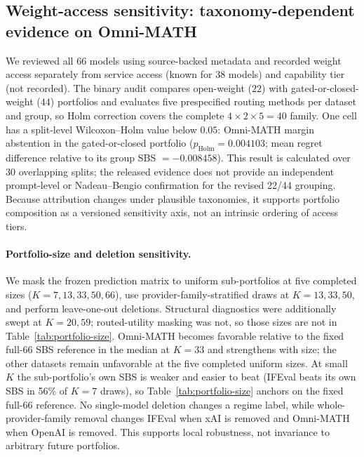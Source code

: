 \documentclass{article}
\begin{document}
\subsection{Weight-access sensitivity: taxonomy-dependent evidence on Omni-MATH}
\label{sec:access-group}
We reviewed all 66 models using source-backed metadata and recorded weight access separately from service access (known for 38 models) and capability tier (not recorded). The binary audit compares open-weight ($22$) with gated-or-closed-weight ($44$) portfolios and evaluates five prespecified routing methods per dataset and group, so Holm correction covers the complete $4\times2\times5=40$ family. One cell has a split-level Wilcoxon--Holm value below $0.05$: Omni-MATH margin abstention in the gated-or-closed portfolio ($p_{\text{Holm}}=0.004103$; mean regret difference relative to its group SBS $=-0.008458$). This result is calculated over 30 overlapping splits; the released evidence does not provide an independent prompt-level or Nadeau--Bengio confirmation for the revised 22/44 grouping. Because attribution changes under plausible taxonomies, it supports portfolio composition as a versioned sensitivity axis, not an intrinsic ordering of access tiers.

\paragraph{Portfolio-size and deletion sensitivity.}
We mask the frozen prediction matrix to uniform sub-portfolios at five completed sizes ($K=7,13,33,50,66$), use provider-family-stratified draws at $K=13,33,50$, and perform leave-one-out deletions. Structural diagnostics were additionally swept at $K=20,59$; routed-utility masking was not, so those sizes are not in Table~\ref{tab:portfolio-size}. Omni-MATH becomes favorable relative to the fixed full-66 SBS reference in the median at $K=33$ and strengthens with size; the other datasets remain unfavorable at the five completed uniform sizes. At small $K$ the sub-portfolio's own SBS is weaker and easier to beat (IFEval beats its own SBS in 56\% of $K=7$ draws), so Table~\ref{tab:portfolio-size} anchors on the fixed full-66 reference. No single-model deletion changes a regime label, while whole-provider-family removal changes IFEval when xAI is removed and Omni-MATH when OpenAI is removed. This supports local robustness, not invariance to arbitrary future portfolios.
\end{document}
